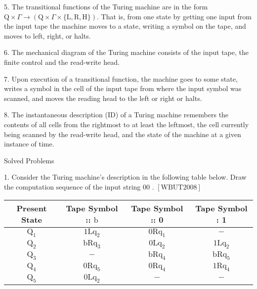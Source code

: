 \documentclass[8pt]{report}
\begin{document}
5. The transitional functions of the Turing machine are in the form $\mathrm{Q} \times \Gamma \rightarrow(\mathrm{Q} \times \Gamma \times\{\mathrm{L}, \mathrm{R}, \mathrm{H}\})$. That is, from one state by getting one input from the input tape the machine moves to a state, writing a symbol on the tape, and moves to left, right, or halts.

6. The mechanical diagram of the Turing machine consists of the input tape, the finite control and the read-write head.

7. Upon execution of a transitional function, the machine goes to some state, writes a symbol in the cell of the input tape from where the input symbol was scanned, and moves the reading head to the left or right or halts.

8. The instantaneous description (ID) of a Turing machine remembers the contents of all cells from the rightmost to at least the leftmost, the cell currently being scanned by the read-write head, and the state of the machine at a given instance of time.

Solved Problems

1. Consider the Turing machine's description in the following table below. Draw the computation sequence of the input string 00 . $[\mathrm{WBUT} 2008]$

\begin{tabular}{cccc}
	\hline Present State & Tape Symbol :: $\mathrm{b}$ & Tape Symbol :: 0 & Tape Symbol : 1 \\
	\hline $\mathrm{Q}_{1}$ & $1 \mathrm{Lq}_{2}$ & $0 \mathrm{Rq}_{1}$ & $-$ \\
	$\mathrm{Q}_{2}$ & $\mathrm{bRq}_{3}$ & $0 \mathrm{Lq}_{2}$ & $1 \mathrm{Lq}_{2}$ \\
	$\mathrm{Q}_{3}$ & $-$ & $\mathrm{bRq}_{4}$ & $\mathrm{bRq}_{5}$ \\
	$\mathrm{Q}_{4}$ & $0 \mathrm{Rq}_{5}$ & $0 \mathrm{Rq}_{4}$ & $1 \mathrm{Rq}_{4}$ \\
	$\mathrm{Q}_{5}$ & $0 \mathrm{Lq}_{2}$ & $-$ & $-$ \\
	\hline
	
\end{tabular}
\end{document}
